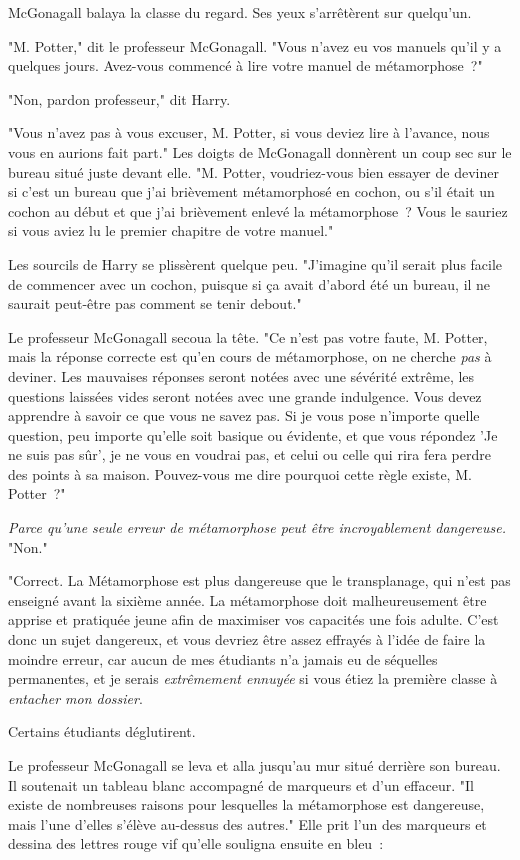 McGonagall balaya la classe du regard. Ses yeux s'arrêtèrent sur quelqu'un.

"M. Potter," dit le professeur McGonagall. "Vous n'avez eu vos manuels qu'il y a quelques jours. Avez-vous commencé à lire votre manuel de métamorphose~?"

"Non, pardon professeur," dit Harry.

"Vous n'avez pas à vous excuser, M. Potter, si vous deviez lire à l'avance, nous vous en aurions fait part." Les doigts de McGonagall donnèrent un coup sec sur le bureau situé juste devant elle. "M. Potter, voudriez-vous bien essayer de deviner si c'est un bureau que j'ai brièvement métamorphosé en cochon, ou s'il était un cochon au début et que j'ai brièvement enlevé la métamorphose~? Vous le sauriez si vous aviez lu le premier chapitre de votre manuel."

Les sourcils de Harry se plissèrent quelque peu. "J'imagine qu'il serait plus facile de commencer avec un cochon, puisque si ça avait d'abord été un bureau, il ne saurait peut-être pas comment se tenir debout."

Le professeur McGonagall secoua la tête. "Ce n'est pas votre faute, M. Potter, mais la réponse correcte est qu'en cours de métamorphose, on ne cherche \emph{pas} à deviner. Les mauvaises réponses seront notées avec une sévérité extrême, les questions laissées vides seront notées avec une grande indulgence. Vous devez apprendre à savoir ce que vous ne savez pas. Si je vous pose n'importe quelle question, peu importe qu'elle soit basique ou évidente, et que vous répondez 'Je ne suis pas sûr', je ne vous en voudrai pas, et celui ou celle qui rira fera perdre des points à sa maison. Pouvez-vous me dire pourquoi cette règle existe, M. Potter~?"

\emph{Parce qu'une seule erreur de métamorphose peut être incroyablement dangereuse.} "Non."

"Correct. La Métamorphose est plus dangereuse que le transplanage, qui n'est pas enseigné avant la sixième année. La métamorphose doit malheureusement être apprise et pratiquée jeune afin de maximiser vos capacités une fois adulte. C'est donc un sujet dangereux, et vous devriez être assez effrayés à l'idée de faire la moindre erreur, car aucun de mes étudiants n'a jamais eu de séquelles permanentes, et je serais \emph{extrêmement ennuyée} si vous étiez la première classe à \emph{entacher mon dossier}.

Certains étudiants déglutirent.

Le professeur McGonagall se leva et alla jusqu'au mur situé derrière son bureau. Il soutenait un tableau blanc accompagné de marqueurs et d'un effaceur. "Il existe de nombreuses raisons pour lesquelles la métamorphose est dangereuse, mais l'une d'elles s'élève au-dessus des autres." Elle prit l'un des marqueurs et dessina des lettres rouge vif qu'elle souligna ensuite en bleu~:

